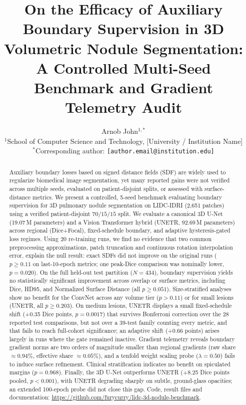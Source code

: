 \documentclass[10pt, a4paper, twocolumn]{article}
\title{\textbf{On the Efficacy of Auxiliary Boundary Supervision in 3D Volumetric Nodule Segmentation: A Controlled Multi-Seed Benchmark and Gradient Telemetry Audit}}
\author{
  Arnob John$^{1,*}$\\
  $^{1}$School of Computer Science and Technology, [University / Institution Name]\\
  $^{*}$Corresponding author: \texttt{[author.email@institution.edu]}
}
\date{}
\begin{document}
\maketitle

\begin{abstract}
Auxiliary boundary losses based on signed distance fields (SDF) are widely used to regularize biomedical image segmentation, yet many reported gains were not verified across multiple seeds, evaluated on patient-disjoint splits, or assessed with surface-distance metrics. We present a controlled, 5-seed benchmark evaluating boundary supervision for 3D pulmonary nodule segmentation on LIDC-IDRI (2,651 patches) using a verified patient-disjoint $70/15/15$ split. We evaluate a canonical 3D U-Net (19.07\,M parameters) and a Vision Transformer hybrid (UNETR, 92.69\,M parameters) across regional (Dice+Focal), fixed-schedule boundary, and adaptive hysteresis-gated loss regimes. Using 20 re-training runs, we find no evidence that two common preprocessing approximations, patch truncation and continuous rotation interpolation error, explain the null result: exact SDFs did not improve on the original runs ($p \ge 0.11$ on last-10-epoch metrics; one peak-Dice comparison was nominally lower, $p=0.020$). On the full held-out test partition ($N=434$), boundary supervision yields no statistically significant improvement across overlap or surface metrics, including Dice, HD95, and Normalized Surface Distance (all $p\ge0.051$). Size-stratified analyses show no benefit for the ConvNet across any volume tier ($p > 0.11$) or for small lesions (UNETR, all $p \ge 0.203$). On medium lesions, UNETR displays a small fixed-schedule shift (+0.35 Dice points, $p=0.0017$) that survives Bonferroni correction over the 28 reported test comparisons, but not over a 39-test family counting every metric, and that fails to reach full-cohort significance; an adaptive shift (+0.66 points) arises largely in runs where the gate remained inactive. Gradient telemetry reveals boundary gradient norms are two orders of magnitude smaller than regional gradients (raw share $\approx0.94\%$, effective share $\approx0.05\%$), and a tenfold weight scaling probe ($\lambda=0.50$) fails to induce surface refinement. Clinical stratification indicates no benefit on spiculated margins ($p=0.968$). Finally, the 3D U-Net outperforms UNETR (+8.25 Dice points pooled, $p<0.001$), with UNETR degrading sharply on subtle, ground-glass opacities; an extended 100-epoch probe did not close this gap. Code, result files and documentation: \url{https://github.com/furycurry/lidc-3d-nodule-benchmark}.
\end{abstract}
\end{document}
